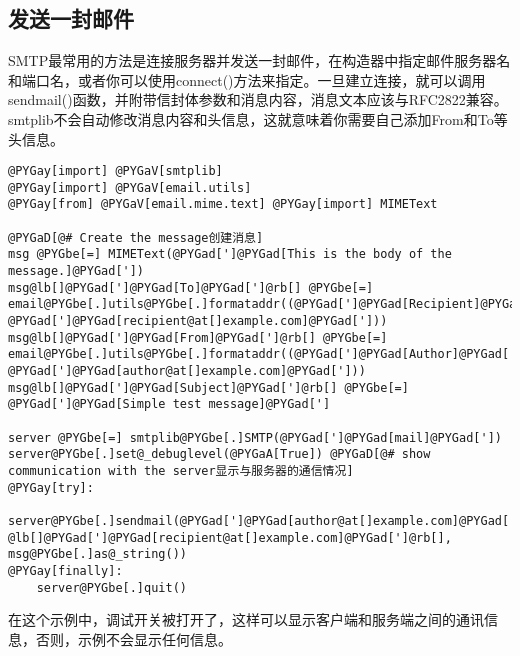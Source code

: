 \documentclass[a4paper,10pt,english]{manual}
\begin{document}
\subsection{发送一封邮件}

SMTP最常用的方法是连接服务器并发送一封邮件，在构造器中指定邮件服务器名和端口名，或者你可以使用connect()方法来指定。一旦建立连接，就可以调用sendmail()函数，并附带信封体参数和消息内容，消息文本应该与RFC2822兼容。smtplib不会自动修改消息内容和头信息，这就意味着你需要自己添加From和To等头信息。

\begin{Verbatim}[commandchars=@\[\]]
@PYGay[import] @PYGaV[smtplib]
@PYGay[import] @PYGaV[email.utils]
@PYGay[from] @PYGaV[email.mime.text] @PYGay[import] MIMEText

@PYGaD[@# Create the message创建消息]
msg @PYGbe[=] MIMEText(@PYGad[']@PYGad[This is the body of the message.]@PYGad['])
msg@lb[]@PYGad[']@PYGad[To]@PYGad[']@rb[] @PYGbe[=] email@PYGbe[.]utils@PYGbe[.]formataddr((@PYGad[']@PYGad[Recipient]@PYGad['], @PYGad[']@PYGad[recipient@at[]example.com]@PYGad[']))
msg@lb[]@PYGad[']@PYGad[From]@PYGad[']@rb[] @PYGbe[=] email@PYGbe[.]utils@PYGbe[.]formataddr((@PYGad[']@PYGad[Author]@PYGad['], @PYGad[']@PYGad[author@at[]example.com]@PYGad[']))
msg@lb[]@PYGad[']@PYGad[Subject]@PYGad[']@rb[] @PYGbe[=] @PYGad[']@PYGad[Simple test message]@PYGad[']

server @PYGbe[=] smtplib@PYGbe[.]SMTP(@PYGad[']@PYGad[mail]@PYGad['])
server@PYGbe[.]set@_debuglevel(@PYGaA[True]) @PYGaD[@# show communication with the server显示与服务器的通信情况]
@PYGay[try]:
    server@PYGbe[.]sendmail(@PYGad[']@PYGad[author@at[]example.com]@PYGad['], @lb[]@PYGad[']@PYGad[recipient@at[]example.com]@PYGad[']@rb[], msg@PYGbe[.]as@_string())
@PYGay[finally]:
    server@PYGbe[.]quit()
\end{Verbatim}

在这个示例中，调试开关被打开了，这样可以显示客户端和服务端之间的通讯信息，否则，示例不会显示任何信息。
\end{document}
